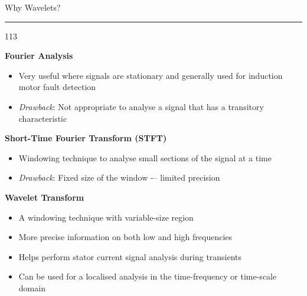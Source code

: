 \documentclass[a4,portrait,slidesonly]{seminar}
\begin{document}
\begin{slide*}
{\large \textsf{Why Wavelets?}}\\
\hrule
\vspace{10pt}
\begin{dinglist} {113}
\item \textbf{Fourier Analysis}
    \begin{itemize}
    \item Very useful where signals are stationary and generally used for induction motor fault detection
    \item \emph{Drawback}: Not appropriate to analyse a signal that has a transitory characteristic
    \end{itemize}
\item \textbf{Short-Time Fourier Transform (STFT)} 
    \begin{itemize}
    \item Windowing technique to analyse small sections of the signal at a time
    \item \emph{Drawback}: Fixed size of the window -– limited precision
    \end{itemize}
\item \textbf{Wavelet Transform}
    \begin{itemize}
    \item A windowing technique with variable-size region
    \item More precise information on both low and high frequencies
    \item Helps perform stator current signal analysis during transients
    \item Can be used for a localised analysis in the time-frequency or time-scale domain
    \end{itemize}
\end{dinglist}
\end{slide*}
\end{document}
